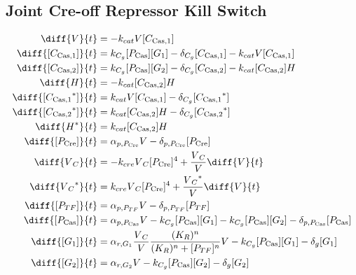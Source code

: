 \subsection{Joint Cre-off Repressor Kill Switch}
\label{s:Joint_Cre_off_Repressor_Kill_Switch}

\begin{align}
\diff{\vectorGen{}}{t} & = - \casCutRate{{}}\vectorGen{}\conc{\cplx{\cas}{1}}\\
\diff{\conc{\cplx{\cas}{1}}}{t} & =  \gRnaBind{}\conc{\proSp{\cas{}}}\conc{\gRna{1}} - \casCompDegradeRate{}\conc{\cplx{\cas}{1}} - \casCutRate{{}}\vectorGen{}\conc{\cplx{\cas}{1}}\\
\diff{\conc{\cplx{\cas}{2}}}{t} & =  \gRnaBind{}\conc{\proSp{\cas{}}}\conc{\gRna{2}} - \casCompDegradeRate{}\conc{\cplx{\cas}{2}} - \casCutRate{{}}\conc{\cplx{\cas}{2}}\hostGen{}\\
\diff{\hostGen{}}{t} & = - \casCutRate{{}}\conc{\cplx{\cas}{2}}\hostGen{}\\
\diff{\conc{\bound{\cplx{\cas}{1}}}}{t} & =  \casCutRate{{}}\vectorGen{}\conc{\cplx{\cas}{1}} - \casCompDegradeRate{}\conc{\bound{\cplx{\cas}{1}}}\\
\diff{\conc{\bound{\cplx{\cas}{2}}}}{t} & =  \casCutRate{{}}\conc{\cplx{\cas}{2}}\hostGen{} - \casCompDegradeRate{}\conc{\bound{\cplx{\cas}{2}}}\\
\diff{\edited{\hostGen{}}}{t} & =  \casCutRate{{}}\conc{\cplx{\cas}{2}}\hostGen{}\\
\diff{\conc{\proSp{\cre{}}}}{t} & =  \txtlRate{\proSp{\cre{}}}\vectorGen{} - \proDegradeRate{\proSp{\cre{}}}\conc{\proSp{\cre{}}}\\
\diff{\vectorGen{}_C}{t} & = - \creCutRate{} \vectorGen{}_C \conc{\proSp{\cre{}}}^4 + \frac{\vectorGen{}_C}{\vectorGen{}} \diff{\vectorGen{}}{t}\\
\diff{\edited{\vectorGen{}_C}}{t} & =  \creCutRate{} \vectorGen{}_C \conc{\proSp{\cre{}}}^4 + \frac{\edited{\vectorGen{}_C}}{\vectorGen{}} \diff{\vectorGen{}}{t}\\
\diff{\conc{\proSp{TF}}}{t} & =  \txtlRate{\proSp{TF}}\vectorGen{} - \proDegradeRate{\proSp{TF}}\conc{\proSp{TF}}\\
\diff{\conc{\proSp{\cas{}}}}{t} & =  \txtlRate{\proSp{\cas{}}}\vectorGen{} - \gRnaBind{}\conc{\proSp{\cas{}}}\conc{\gRna{1}} - \gRnaBind{}\conc{\proSp{\cas{}}}\conc{\gRna{2}} - \proDegradeRate{\proSp{\cas{}}}\conc{\proSp{\cas{}}}\\
\diff{\conc{\gRna{1}}}{t} & =  \txRate{\gRna{1}}\frac{\vectorGen{}_C}{\vectorGen{}}\frac{(K_R)^n}{(K_R)^n + \conc{\proSp{TF}}^n}\vectorGen{} - \gRnaBind{}\conc{\proSp{\cas{}}}\conc{\gRna{1}} - \rnaDegradeRate{}\conc{\gRna{1}}\\
\diff{\conc{\gRna{2}}}{t} & =  \txRate{\gRna{2}}\vectorGen{} - \gRnaBind{}\conc{\proSp{\cas{}}}\conc{\gRna{2}} - \rnaDegradeRate{}\conc{\gRna{2}}
\end{align}

